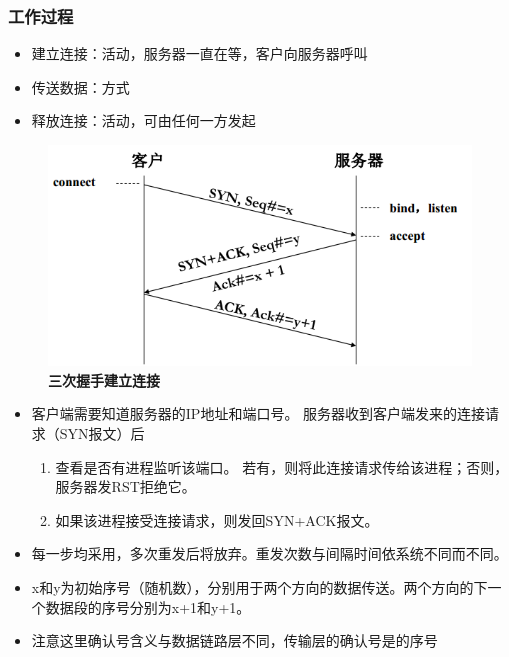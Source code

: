 \subsubsection{工作过程}
\begin{center}
\end{center}
\begin{itemize}
    \item 建立连接：活动，服务器一直在等，客户向服务器呼叫
    \item 传送数据：方式
    \item 释放连接：活动，可由任何一方发起
\end{itemize}

\myhline
\begin{figure}[H]
    \centering
    \includegraphics[width=0.6\linewidth]{fig/tcp_connect.png}
    \caption*{\textbf{三次握手建立连接}}
\end{figure}
\begin{itemize}
    \item 客户端需要知道服务器的IP地址和端口号。
    服务器收到客户端发来的连接请求（SYN报文）后
    \begin{enumerate}
        \item 查看是否有进程监听该端口。
        若有，则将此连接请求传给该进程；否则，服务器发RST拒绝它。
        \item 如果该进程接受连接请求，则发回SYN+ACK报文。
    \end{enumerate}
    \item 每一步均采用，多次重发后将放弃。重发次数与间隔时间依系统不同而不同。
    \item x和y为初始序号（随机数），分别用于两个方向的数据传送。两个方向的下一个数据段的序号分别为x+1和y+1。
    \item 注意这里确认号含义与数据链路层不同，传输层的确认号是\textcolor{red}{}的序号
\end{itemize}

